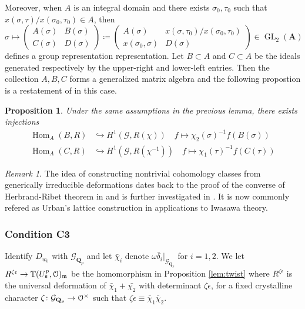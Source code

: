 \documentclass[leqno]{amsart}
\newtheorem{prop}[thm]{Proposition}
\theoremstyle{definition}
\theoremstyle{remark}
\newtheorem{rem}[thm]{Remark}
\newcommand{\eo}{\EuScript{O}}
\newcommand{\Qp}{\mathbf{Q}_p}
\newcommand{\A}{\mathbf A}
\DeclareMathOperator{\Hom}{Hom}
\DeclareMathOperator{\GL}{GL}
\newcommand{\fm}{\mathfrak{m}}
\newcommand{\fs}{\mathfrak{s}}
\newcommand{\Gp}{\mathcal{G}_{\Qp}} %
\newcommand{\TT}{\mathbb{T}} %
\begin{document}
Moreover, when $A$ is an integral domain
and there exists $\sigma_0,\tau_0$ such that
$x(\sigma,\tau)/x(\sigma_0,\tau_0)\in A$, then 
\[
    \sigma\mapsto 
    \begin{pmatrix}
        A(\sigma)& B(\sigma)\\
        C(\sigma) & D(\sigma)
    \end{pmatrix}\coloneqq
    \begin{pmatrix}
        A(\sigma)& x(\sigma,\tau_0)/x(\sigma_0,\tau_0)\\
        x(\sigma_0,\sigma) & D(\sigma)
    \end{pmatrix}
        \in \GL_2(\A)
\]
defines a group representation representation.
Let $B\subset A$ and $C\subset A$
be the ideals generated respectively by the 
upper-right and lower-left entries.
Then the collection $A, B, C$
forms a generalized matrix algebra 
and the following propostion is a restatement
of \cite[Thm 1.5.5]{BC} in this case.
\begin{prop}
Under the same assumptions in the previous lemma,
there exists injections 
\begin{align*}
    \Hom_A(B,R)&\hookrightarrow H^1(\mathcal{G},R(\chi))\quad
    f\mapsto \chi_2(\sigma)^{-1}f(B(\sigma))\\
    \Hom_A(C,R)&\hookrightarrow H^1(\mathcal{G},R(\chi^{-1}))\quad
    f\mapsto \chi_1(\tau)^{-1}f(C(\tau))
\end{align*}
\end{prop}

\begin{rem}
The idea of constructing nontrivial cohomology classes
from generically irreducible deformations
dates back to the proof of the converse of
Herbrand-Ribet theorem in \cite{Ribet1976}
and is further investigated in \cite{Urban1999}.
It is now commonly refered as Urban's lattice construction
in applications to Iwasawa theory.
\end{rem}

\subsubsection{Condition C3}

Identify $D_{w_0}$ with $\Gp$ and
let $\bar{\chi}_i$ denote
$\omega\bar{\delta}_i\vert_{\Gp}$ for $i=1,2$.
We let $R^{\zeta\epsilon}\to \TT(U^p_\fs,\eo)_\fm$
be the homomorphism in Proposition \ref{lem:twist}
where $R^{\zeta\epsilon}$ is the universal 
deformation of $\bar{\chi}_1+\bar{\chi_2}$
with determinant $\zeta\epsilon$,
for a fixed crystalline character 
$\zeta\colon \Gp\to\eo^\times$
such that $\zeta\epsilon\equiv\bar{\chi}_1\bar{\chi}_2$.
\end{document}
